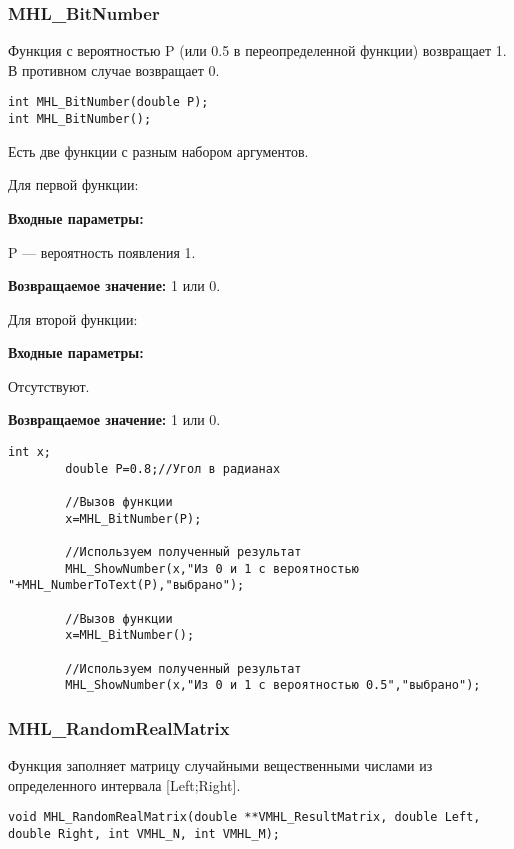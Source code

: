 \documentclass[a4paper,12pt]{article}
\begin{document}
\subsubsection{MHL\_BitNumber}\label{MHL_BitNumber}

Функция с вероятностью P (или 0.5 в переопределенной функции) возвращает 1. В противном случае возвращает 0.


\begin{lstlisting}[label=code_syntax_MHL_BitNumber,caption=Синтаксис]
int MHL_BitNumber(double P);
int MHL_BitNumber();
\end{lstlisting}

Есть две функции с разным набором аргументов.

Для первой функции:

\textbf{Входные параметры:}

 P --- вероятность появления 1.

\textbf{Возвращаемое значение:}
1 или 0.

Для второй функции:

\textbf{Входные параметры:}

 Отсутствуют.

\textbf{Возвращаемое значение:}
1 или 0.


\begin{lstlisting}[label=code_use_MHL_BitNumber,caption=Пример использования]
        int x;
        double P=0.8;//Угол в радианах

        //Вызов функции
        x=MHL_BitNumber(P);

        //Используем полученный результат
        MHL_ShowNumber(x,"Из 0 и 1 с вероятностью "+MHL_NumberToText(P),"выбрано");

        //Вызов функции
        x=MHL_BitNumber();

        //Используем полученный результат
        MHL_ShowNumber(x,"Из 0 и 1 с вероятностью 0.5","выбрано");
\end{lstlisting}

\subsubsection{MHL\_RandomRealMatrix}\label{MHL_RandomRealMatrix}

Функция заполняет матрицу случайными вещественными числами из определенного интервала [Left;Right].


\begin{lstlisting}[label=code_syntax_MHL_RandomRealMatrix,caption=Синтаксис]
void MHL_RandomRealMatrix(double **VMHL_ResultMatrix, double Left, double Right, int VMHL_N, int VMHL_M);
\end{lstlisting}
\end{document}
